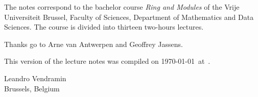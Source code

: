 \preface

The notes correspond to the bachelor 
course \emph{Ring and Modules} of the 
Vrije Universiteit Brussel, 
Faculty of Sciences, 
Department of Mathematics and Data Sciences.  The course
is divided into thirteen two-hours lectures. 

Thanks go to Arne van Antwerpen and Geoffrey Jassens. 

This version of the lecture notes 
was compiled on \today~at~\currenttime.

\begin{flushright}
Leandro Vendramin\\Brussels, Belgium\par
\end{flushright}